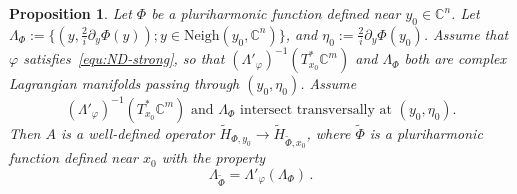 \documentclass{article}
\newtheorem{prop}[theo]{Proposition}
\newcommand{\Vois}{\mathrm{Neigh}}
\newcommand{\phy}{\varphi}
\newcommand{\CM}{\mathbb{C}}
\begin{document}
\begin{prop}
  \label{prop:fio}
  Let $\Phi$ be a pluriharmonic function defined near
  $y_0\in\CM^n$. Let
  $\Lambda_\Phi:=\{(y,\frac{2}{i}\partial_y\Phi(y));
  y\in\Vois(y_0,\CM^n)\}$,
  and $\eta_0:=\frac{2}{i}\partial_y \Phi(y_0)$. Assume that $\phy$
  satisfies~\eqref{equ:ND-strong}, so that
  $(\Lambda'_\phy)^{-1}(T^*_{x_0}\CM^m)$ and $\Lambda_\Phi$ both are
  complex Lagrangian manifolds passing through $(y_0,\eta_0)$. Assume
  \begin{equation}
    \label{equ:transv-inter}
    (\Lambda'_\phy)^{-1}(T^*_{x_0}\CM^m) \text{ and } \Lambda_\Phi
    \text{ intersect transversally at } (y_0,\eta_0).
  \end{equation}
  Then $A$ is a well-defined operator
  $\widetilde H_{\Phi,y_0}\to \widetilde H_{\widetilde\Phi, x_0}$,
  where $\widetilde\Phi$ is a pluriharmonic function defined near
  $x_0$ with the property
  \begin{equation}
    \label{equ:fio-lagrangian}
    \Lambda_{\widetilde\Phi} = \Lambda'_\phy(\Lambda_\Phi)\,.
  \end{equation}
\end{prop}
\end{document}

